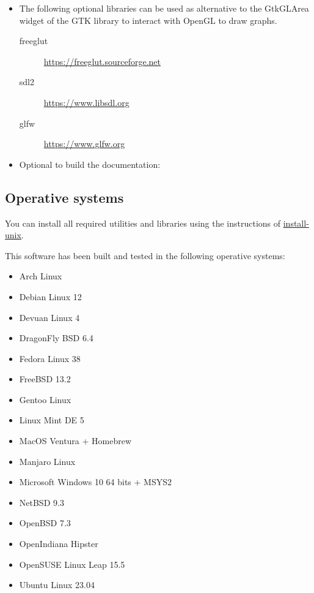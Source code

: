 \begin{itemize}
\item The following optional libraries can be used as alternative to the
GtkGLArea widget of the GTK library to interact with OpenGL to draw graphs.
\begin{description}
\item[freeglut]\url{https://freeglut.sourceforge.net}
\item[sdl2]\url{https://www.libsdl.org}
\item[glfw]\url{https://www.glfw.org}
\end{description}

\item Optional to build the documentation:

\end{itemize}

\subsection{Operative systems}

You can install all required utilities and libraries using the instructions of
\href{https://github.com/jburguete/install-unix}{install-unix}.

This software has been built and tested in the following operative systems:
\begin{itemize}
\item Arch Linux
\item Debian Linux 12
\item Devuan Linux 4
\item DragonFly BSD 6.4
\item Fedora Linux 38
\item FreeBSD 13.2
\item Gentoo Linux
\item Linux Mint DE 5
\item MacOS Ventura + Homebrew
\item Manjaro Linux
\item Microsoft Windows 10 64 bits + MSYS2
\item NetBSD 9.3
\item OpenBSD 7.3
\item OpenIndiana Hipster
\item OpenSUSE Linux Leap 15.5
\item Ubuntu Linux 23.04
\end{itemize}

